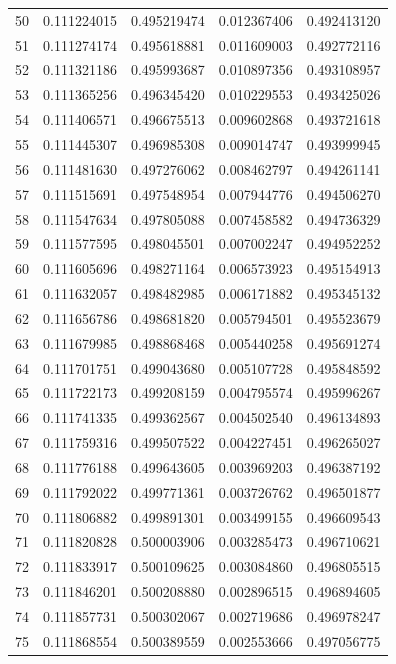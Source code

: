 \begin{tabular}{rcccc}
50 & 0.111224015 & 0.495219474 & 0.012367406 & 0.492413120 \\
51 & 0.111274174 & 0.495618881 & 0.011609003 & 0.492772116 \\
52 & 0.111321186 & 0.495993687 & 0.010897356 & 0.493108957 \\
53 & 0.111365256 & 0.496345420 & 0.010229553 & 0.493425026 \\
54 & 0.111406571 & 0.496675513 & 0.009602868 & 0.493721618 \\
55 & 0.111445307 & 0.496985308 & 0.009014747 & 0.493999945 \\
56 & 0.111481630 & 0.497276062 & 0.008462797 & 0.494261141 \\
57 & 0.111515691 & 0.497548954 & 0.007944776 & 0.494506270 \\
58 & 0.111547634 & 0.497805088 & 0.007458582 & 0.494736329 \\
59 & 0.111577595 & 0.498045501 & 0.007002247 & 0.494952252 \\
60 & 0.111605696 & 0.498271164 & 0.006573923 & 0.495154913 \\
61 & 0.111632057 & 0.498482985 & 0.006171882 & 0.495345132 \\
62 & 0.111656786 & 0.498681820 & 0.005794501 & 0.495523679 \\
63 & 0.111679985 & 0.498868468 & 0.005440258 & 0.495691274 \\
64 & 0.111701751 & 0.499043680 & 0.005107728 & 0.495848592 \\
65 & 0.111722173 & 0.499208159 & 0.004795574 & 0.495996267 \\
66 & 0.111741335 & 0.499362567 & 0.004502540 & 0.496134893 \\
67 & 0.111759316 & 0.499507522 & 0.004227451 & 0.496265027 \\
68 & 0.111776188 & 0.499643605 & 0.003969203 & 0.496387192 \\
69 & 0.111792022 & 0.499771361 & 0.003726762 & 0.496501877 \\
70 & 0.111806882 & 0.499891301 & 0.003499155 & 0.496609543 \\
71 & 0.111820828 & 0.500003906 & 0.003285473 & 0.496710621 \\
72 & 0.111833917 & 0.500109625 & 0.003084860 & 0.496805515 \\
73 & 0.111846201 & 0.500208880 & 0.002896515 & 0.496894605 \\
74 & 0.111857731 & 0.500302067 & 0.002719686 & 0.496978247 \\
75 & 0.111868554 & 0.500389559 & 0.002553666 & 0.497056775 \\

\end{tabular}
